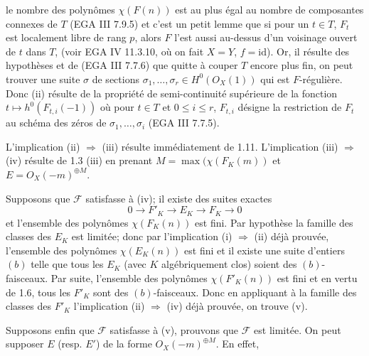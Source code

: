 
le nombre des polynômes \(\chi(F(n))\) est au plus égal au nombre de composantes connexes de \(T\) (EGA III 7.9.5) et c'est un petit lemme que si pour un \(t\in T\), \(F_t\) est localement libre de rang \(p\), alors \(F\) l'est aussi au-dessus d'un voisinage ouvert de \(t\) dans \(T\), (voir EGA IV 11.3.10, où on fait \(X=Y\), \(f=\mathrm{id}\)). Or, il résulte des hypothèses et de (EGA III 7.7.6) que quitte à couper \(T\) encore plus fin, on peut trouver une suite \(\sigma\) de sections \(\sigma_1,\ldots,\sigma_r\in H^0({O}_X(1))\) qui est \(F\)-régulière. Donc (ii) résulte de la propriété de semi-continuité supérieure de la fonction \(t\longmapsto h^0(F_{t,i}(-1))\) où pour \(t\in T\) et \(0\le i\le r\), \(F_{t,i}\) désigne la restriction de \(F_t\) au schéma des zéros de \(\sigma_1,\ldots,\sigma_i\) (EGA III 7.7.5).

L'implication (ii) \(\Rightarrow\) (iii) résulte immédiatement de 1.11. L'implication (iii) \(\Rightarrow\) (iv) résulte de 1.3 (iii) en prenant \(M=\max(\chi(F_K(m))\) et \(E={O}_X(-m)^{\oplus M}\).

Supposons que \(\mathcal F\) satisfasse à (iv); il existe des suites exactes
\[
0\longrightarrow F'_K\longrightarrow E_K\longrightarrow F_K\longrightarrow0
\]
et l'ensemble des polynômes \(\chi(F_K(n))\) est fini. Par hypothèse la famille des classes des \(E_K\) est limitée; donc par l'implication (i) \(\Rightarrow\) (ii) déjà prouvée, l'ensemble des polynômes \(\chi(E_K(n))\) est fini et il existe une suite d'entiers \((b)\) telle que tous les \(E_K\) (avec \(K\) algébriquement clos) soient des \((b)\)-faisceaux. Par suite, l'ensemble des polynômes \(\chi(F'_K(n))\) est fini et en vertu de 1.6, tous les \(F'_K\) sont des \((b)\)-faisceaux. Donc en appliquant à la famille des classes des \(F'_K\) l'implication (ii) \(\Rightarrow\) (iv) déjà prouvée, on trouve (v).

Supposons enfin que \(\mathcal F\) satisfasse à (v), prouvons que \(\mathcal F\) est limitée. On peut supposer \(E\) (resp. \(E'\)) de la forme \({O}_X(-m)^{\oplus M}\). En effet,
